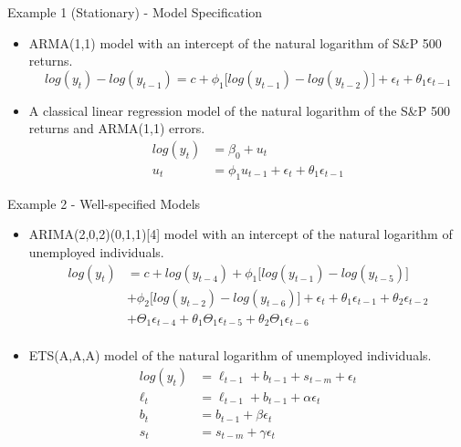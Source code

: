 \begin{frame}{Example 1 (Stationary) - Model Specification}

    \begin{itemize}
    \item ARMA(1,1) model with an intercept of the natural logarithm of S\&P 500 returns. 
        \begin{equation*}
    log(y_t) - log(y_{t-1}) = c + \phi_1\big[log(y_{t-1})-log(y_{t-2})\big] + \epsilon_t + \theta_1\epsilon_{t-1}
    \end{equation*}

    \item A classical linear regression model of the natural logarithm of the S\&P 500 returns and ARMA(1,1) errors. 
    \begin{align*}
    log(y_t) &= \beta_0 + u_t \\
    u_t &= \phi_1 u_{t-1} + \epsilon_t + \theta_1\epsilon_{t-1}
    \end{align*}
    \end{itemize}
    
\end{frame}



\begin{frame}{Example 2 - Well-specified Models}

    \begin{itemize}
    \item ARIMA(2,0,2)(0,1,1)[4] model with an intercept of the natural logarithm of unemployed individuals.
    \begin{align*}
    log(y_t) &= c + log(y_{t-4}) + \phi_1\big[log(y_{t-1})-log(y_{t-5})\big] \\
    & + \phi_2\big[log(y_{t-2})-log(y_{t-6})\big] + \epsilon_t + \theta_1\epsilon_{t-1} + \theta_2\epsilon_{t-2} \\
    & + \Theta_1\epsilon_{t-4} + \theta_1\Theta_1\epsilon_{t-5} + \theta_2\Theta_1\epsilon_{t-6} \\
    \end{align*}

    \vspace{-5mm}

    \item ETS(A,A,A) model of the natural logarithm of unemployed individuals. 
    \begin{align*}
    log(y_t) &= \ell_{t-1} + b_{t-1} + s_{t-m} + \epsilon_t \\
    \ell_t &= \ell_{t-1} + b_{t-1} + \alpha \epsilon_t \\
    b_t &= b_{t-1} + \beta \epsilon_t \\
    s_{t} &= s_{t-m} + \gamma \epsilon_t
    \end{align*}
    \end{itemize}
    
\end{frame}



